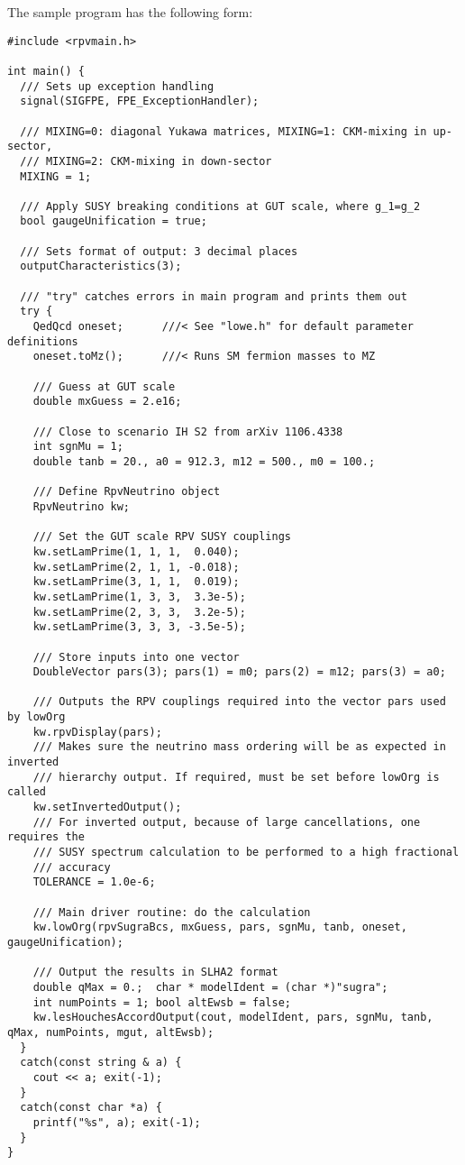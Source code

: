 \documentclass[pdflatex,final,3p,times]{elsarticle}
\begin{document}
The sample program has the following form: 
\small
\begin{verbatim}
#include <rpvmain.h>

int main() {
  /// Sets up exception handling
  signal(SIGFPE, FPE_ExceptionHandler); 

  /// MIXING=0: diagonal Yukawa matrices, MIXING=1: CKM-mixing in up-sector, 
  /// MIXING=2: CKM-mixing in down-sector
  MIXING = 1; 

  /// Apply SUSY breaking conditions at GUT scale, where g_1=g_2
  bool gaugeUnification = true;

  /// Sets format of output: 3 decimal places
  outputCharacteristics(3);
  
  /// "try" catches errors in main program and prints them out
  try {
    QedQcd oneset;      ///< See "lowe.h" for default parameter definitions 
    oneset.toMz();      ///< Runs SM fermion masses to MZ

    /// Guess at GUT scale
    double mxGuess = 2.e16;
    
    /// Close to scenario IH S2 from arXiv 1106.4338
    int sgnMu = 1;
    double tanb = 20., a0 = 912.3, m12 = 500., m0 = 100.;

    /// Define RpvNeutrino object    
    RpvNeutrino kw;

    /// Set the GUT scale RPV SUSY couplings
    kw.setLamPrime(1, 1, 1,  0.040);
    kw.setLamPrime(2, 1, 1, -0.018);
    kw.setLamPrime(3, 1, 1,  0.019);	
    kw.setLamPrime(1, 3, 3,  3.3e-5);
    kw.setLamPrime(2, 3, 3,  3.2e-5);
    kw.setLamPrime(3, 3, 3, -3.5e-5);

    /// Store inputs into one vector
    DoubleVector pars(3); pars(1) = m0; pars(2) = m12; pars(3) = a0;

    /// Outputs the RPV couplings required into the vector pars used by lowOrg
    kw.rpvDisplay(pars);
    /// Makes sure the neutrino mass ordering will be as expected in inverted
    /// hierarchy output. If required, must be set before lowOrg is called 
    kw.setInvertedOutput();
    /// For inverted output, because of large cancellations, one requires the
    /// SUSY spectrum calculation to be performed to a high fractional
    /// accuracy
    TOLERANCE = 1.0e-6;

    /// Main driver routine: do the calculation
    kw.lowOrg(rpvSugraBcs, mxGuess, pars, sgnMu, tanb, oneset, gaugeUnification);

    /// Output the results in SLHA2 format
    double qMax = 0.;  char * modelIdent = (char *)"sugra"; 
    int numPoints = 1; bool altEwsb = false;
    kw.lesHouchesAccordOutput(cout, modelIdent, pars, sgnMu, tanb, qMax, numPoints, mgut, altEwsb);
  }
  catch(const string & a) {
    cout << a; exit(-1);
  }
  catch(const char *a) {
    printf("%s", a); exit(-1);
  }
}
\end{verbatim}
\end{document}
